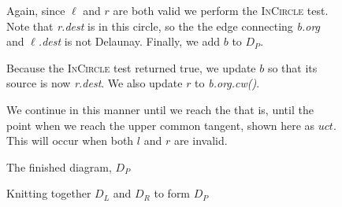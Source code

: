 \documentclass[12pt,twoside]{reedthesis}
\begin{document}
      \begin{figure}[!htb]
        \ContinuedFloat
        \centering
        \begin{subtable}{\textwidth}
          \centering
          
          \caption{Again, since $\ell$ and $r$ are both valid we perform the \textsc{InCircle} test. Note that \textit{r.dest} is in this circle, so the the edge connecting \textit{b.org} and \textit{$\ell$.dest} is not Delaunay. Finally, we add $b$ to $D_{P}$.}
          \label{fig:del_knit10}
        \end{subtable}
      \end{figure}

      \begin{figure}[!htb]
        \ContinuedFloat
        \centering
        \begin{subtable}{\textwidth}
          \centering
          
          \caption{Because the \textsc{InCircle} test returned true, we update $b$ so that its source is now \textit{r.dest}. We also update $r$ to \textit{b.org.cw()}.}
          \label{fig:del_knit11}
        \end{subtable}
      \end{figure}

      \begin{figure}[!htb]
        \ContinuedFloat
        \centering
        \begin{subtable}{\textwidth}
          \centering
          
          \caption{We continue in this manner until we reach the  that is, until the point when we reach the upper common tangent, shown here as $uct$. This will occur when both $l$ and $r$ are invalid.}
          \label{fig:del_knit12}
        \end{subtable}
      \end{figure}

      \begin{figure}
        \ContinuedFloat
        \centering
        \begin{subtable}{\textwidth}
          \centering
          
          \caption{The finished diagram, $D_{P}$}
          \label{fig:del_knit_done}
        \end{subtable}
        \caption{Knitting together $D_{L}$ and $D_{R}$ to form $D_{P}$}
        \label{fig:del_knit_all}
      \end{figure}
    \clearpage
\end{document}
